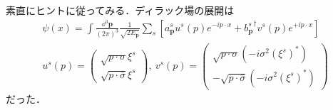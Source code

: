 \documentclass[pdflatex,unicode,ja=standard,12pt]{beamer}
\begin{document}
\begin{frame}
  
  \frametitle{\subsecname}

  素直にヒントに従ってみる．ディラック場の展開は
  \begin{gather}
    \psi(x)
    =
    \int\frac{\dd^3 \mathbf{p}}{(2\pi)^3}
    \frac{1}{\sqrt{2E_{\mathbf{p}}}}
    \sum_{s}
    \left[  
      a^s_{\mathbf{p}}u^{s}(p)e^{-ip\cdot x}
      +
      {b_{\mathbf{p}}^s}^{\dag}v^s(p)e^{+ip\cdot x}
    \right]
    \\
    u^s(p)
    =
    \begin{pmatrix}
      \sqrt{p\cdot \sigma}\xi^s \\
      \sqrt{p\cdot \bar{\sigma}}\xi^s
    \end{pmatrix}
    ,\ 
    v^s(p)
    =
    \begin{pmatrix}
      \sqrt{p\cdot \sigma}(-i\sigma^2(\xi^s)^{*}) \\
      -\sqrt{p\cdot \bar{\sigma}}(-i\sigma^2(\xi^s)^{*}) 
    \end{pmatrix}
  \end{gather}
  だった．

\end{frame}
\end{document}
